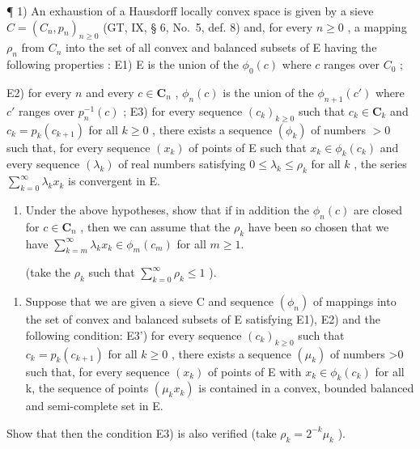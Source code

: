 \exercisegroup

¶ 1) An exhaustion of a Hausdorff locally convex space is given by a sieve \(C = (C_n, p_n)_{n \geqslant 0}\) (GT, IX, § 6, No.~5, def. 8) and, for every \(n \geqslant 0\) , a mapping \(\rho_n\) from \(C_n\) into the set of all convex and balanced subsets of E having the following properties : E1) E is the union of the \(\phi_0(c)\) where \(c\) ranges over \(C_0\) ;

E2) for every \(n\) and every \(c \in \mathbf{C}_n\) , \(\phi_n(c)\) is the union of the \(\phi_{n+1}(c')\) where \(c'\) ranges over \(p_n^{-1}(c)\) ; E3) for every sequence \((c_k)_{k \geqslant 0}\) such that \(c_k \in \mathbf{C}_k\) and \(c_k = p_k(c_{k+1})\) for all \(k \geqslant 0\) , there exists a sequence \((\phi_k)\) of numbers \(>0\) such that, for every sequence \((x_k)\) of points of E such that \(x_k \in \phi_k(c_k)\) and every sequence \((\lambda_k)\) of real numbers satisfying \(0 \leqslant \lambda_k \leqslant \rho_k\) for all \(k\) , the series \(\sum_{k=0}^{\infty} \lambda_k x_k\) is convergent in E.

\begin{enumerate}
\def\labelenumi{\alph{enumi})}
\tightlist
\item
  Under the above hypotheses, show that if in addition the \(\phi_n(c)\) are closed for \(c \in \mathbf{C}_n\) , then we can assume that the \(\rho_k\) have been so chosen that we have \(\sum_{k=m}^{\infty} \lambda_k x_k \in \phi_m(c_m)\) for all \(m \geqslant 1\).

(take the \(\rho_{k}\) such that \(\sum_{k=0}^{\infty} \rho_{k} \leqslant 1\) ).
\end{enumerate}

\begin{enumerate}
\def\labelenumi{\alph{enumi})}
\setcounter{enumi}{1}
\tightlist
\item
  Suppose that we are given a sieve C and sequence \((\phi_{n})\) of mappings into the set of convex and balanced subsets of E satisfying E1), E2) and the following condition: E3') for every sequence \((c_{k})_{k\geq0}\) such that \(c_{k}=p_{k}(c_{k+1})\) for all \(k\geq0\) , there exists a sequence \((\mu_{k})\) of numbers \textgreater0 such that, for every sequence \((x_{k})\) of points of E with \(x_{k}\in\phi_{k}(c_{k})\) for all k, the sequence of points \((\mu_{k}x_{k})\) is contained in a convex, bounded balanced and semi-complete set in E.
\end{enumerate}

Show that then the condition E3) is also verified (take \(\rho_{k} = 2^{-k}\mu_{k}\) ).

